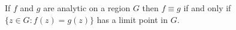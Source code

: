 If $f$ and $g$ are analytic on a region $G$ then $f \equiv g$ if and only if $\{z \in G: f(z) = g(z)\}$ has a limit point in $G$.
